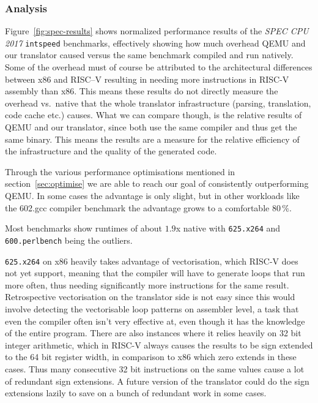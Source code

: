 \subsubsection{Analysis}
Figure~\ref{fig:spec-results} shows normalized performance results of the \textit{SPEC CPU 2017} \texttt{intspeed} benchmarks, effectively showing how much overhead QEMU and our translator caused versus the same benchmark compiled and run natively.
Some of the overhead must of course be attributed to the architectural differences between x86 and RISC--V resulting in needing more instructions in RISC-V assembly than x86.
This means these results do not directly measure the overhead vs.\ native that the whole translator infrastructure (parsing, translation, code cache etc.) causes.
What we can compare though, is the relative results of QEMU and our translator, since both use the same compiler and thus get the same binary.
This means the results are a measure for the relative efficiency of the infrastructure and the quality of the generated code.

Through the various performance optimisations mentioned in section~\vref{sec:optimise} we are able to reach our goal of consistently outperforming QEMU\@.
In some cases the advantage is only slight, but in other workloads like the 602.gcc compiler benchmark the advantage grows to a comfortable $80\,\%$.

Most benchmarks show runtimes of about $1.9$x native with \texttt{625.x264} and \texttt{600.perlbench} being the outliers.

\texttt{625.x264} on x86 heavily takes advantage of vectorisation, which RISC-V does not yet support, meaning that the compiler will have to generate loops that run more often, thus needing significantly more instructions for the same result.
Retrospective vectorisation on the translator side is not easy since this would involve detecting the vectorisable loop patterns on assembler level, a task that even the compiler often isn't very effective at, even though it has the knowledge of the entire program.
There are also instances where it relies heavily on 32 bit integer arithmetic, which in RISC-V always causes the results to be sign extended to the 64 bit register width, in comparison to x86 which zero extends in these cases.
Thus many consecutive 32 bit instructions on the same values cause a lot of redundant sign extensions.
A future version of the translator could do the sign extensions lazily to save on a bunch of redundant work in some cases.

